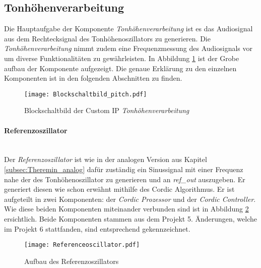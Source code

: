 \subsection{Tonhöhenverarbeitung}\label{subsec:Pitch_Generation}

Die Hauptaufgabe der Komponente \textit{Tonhöhenverarbeitung} ist es das Audiosignal aus dem Rechtecksignal des Tonhöhenoszillators zu generieren. Die \textit{Tonhöhenverarbeitung} nimmt zudem eine Frequenzmessung des Audiosignals vor um diverse Funktionalitäten zu gewährleisten. In Abbildung \ref{img:Blockschaltbild_pitch} ist der Grobe aufbau der Komponente aufgezeigt. Die genaue Erklärung zu den einzelnen Komponenten ist in den folgenden Abschnitten zu finden.


\begin{figure}[h!]
	\centering
	\texttt{[image: Blockschaltbild\_pitch.pdf]}
	\caption{Blockschaltbild der Custom IP \textit{Tonhöhenverarbeitung}} 
	\label{img:Blockschaltbild_pitch}
\end{figure}  



\paragraph{Referenzoszillator}\mbox{}\\

Der \textit{Referenzoszillator} ist wie in der analogen Version aus Kapitel \ref{subsec:Theremin_analog} dafür zuständig ein Sinussignal mit einer Frequenz nahe der des Tonhöhenoszillator zu generieren und an \textit{ref\_out} auszugeben. Er generiert diesen wie schon erwähnt mithilfe des Cordic Algorithmus. Er ist aufgeteilt in zwei Komponenten: der \textit{Cordic Prozessor} und der \textit{Cordic Controller}. Wie diese beiden Komponenten miteinander verbunden sind ist in Abbildung \ref{img:Referenceoscillator} ersichtlich. Beide Komponenten stammen aus dem Projekt 5. Änderungen, welche im Projekt 6 stattfanden, sind entsprechend gekennzeichnet. \\

\begin{figure}[h!]
	\centering
	\texttt{[image: Referenceoscillator.pdf]}
	\caption{Aufbau des Referenzoszillators} 
	\label{img:Referenceoscillator}
\end{figure}  

